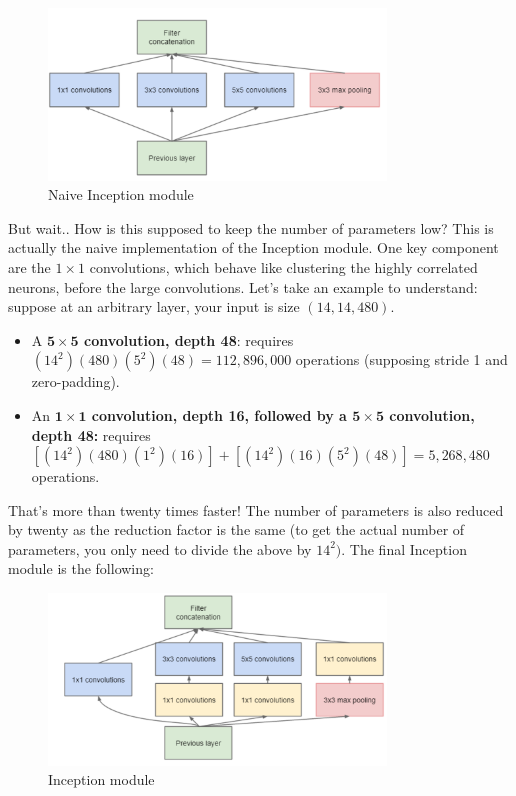 \begin{figure}[H]
    \centering
    \includegraphics[width=0.8\textwidth]{Images/naiveinception.png}
    \caption{Naive Inception module \cite{googlenet}}
\end{figure}

But wait.. How is this supposed to keep the number of parameters low? This is actually the naive implementation of the Inception module. One key component are the $1\times 1$ convolutions, which behave like clustering the highly correlated neurons, before the large convolutions. Let's take an example to understand: suppose at an arbitrary layer, your input is size $(14, 14, 480)$.
\begin{itemize}
\item A \textbf{$\mathbf{5\times 5}$ convolution, depth 48}: requires $(14^2)(480)(5^2)(48) = 112,896,000$ operations (supposing stride 1 and zero-padding).
\item An \textbf{$\mathbf{1\times 1}$ convolution, depth 16, followed by a $\mathbf{5\times 5}$ convolution, depth 48:} requires $[(14^2)(480)(1^2)(16)] + [(14^2)(16)(5^2)(48)] = 5,268,480$ operations.
\end{itemize}

That's more than twenty times faster! The number of parameters is also reduced by twenty as the reduction factor is the same (to get the actual number of parameters, you only need to divide the above by $14^2)$. The final Inception module is the following:

\begin{figure}[H]
    \centering
    \includegraphics[width=0.8\textwidth]{Images/inception.png}
    \caption{Inception module \cite{googlenet}}
\end{figure}

